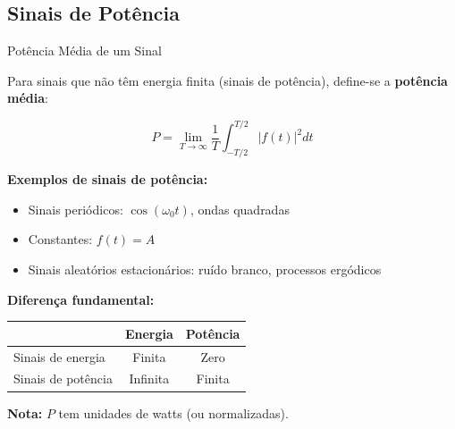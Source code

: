 
\subsection{Sinais de Potência}

\begin{frame}{Potência Média de um Sinal}

Para sinais que não têm energia finita (sinais de potência), define-se a \textbf{potência média}:

\[
P = \lim_{T \to \infty} \frac{1}{T} \int_{-T/2}^{T/2} |f(t)|^2 dt
\]

\textbf{Exemplos de sinais de potência:}

\begin{itemize}
\item Sinais periódicos: $\cos(\omega_0 t)$, ondas quadradas
\item Constantes: $f(t) = A$
\item Sinais aleatórios estacionários: ruído branco, processos ergódicos
\end{itemize}

\vspace{0.1cm}

\textbf{Diferença fundamental:}

\begin{center}
\begin{tabular}{|l|c|c|}
\hline
& \textbf{Energia} & \textbf{Potência} \\
\hline
Sinais de energia & Finita & Zero \\
Sinais de potência & Infinita & Finita \\
\hline
\end{tabular}
\end{center}

\textbf{Nota:} $P$ tem unidades de watts (ou normalizadas).

\end{frame}


